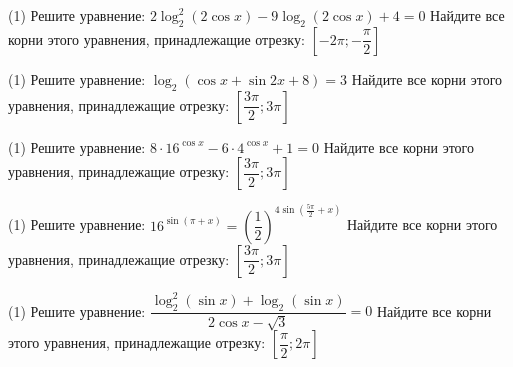 \begin{homework}[number=1]
	\begin{listofex}
		\item %
		\begin{tasks}(1)
			\task Решите уравнение: \( 2\log_2^2 (2\cos x) - 9 \log_2 (2\cos x) +4 = 0 \)
			\task Найдите все корни этого уравнения, принадлежащие отрезку: \( \left[ -2\pi; -\dfrac{\pi}{2} \right] \)
		\end{tasks}
		\item %
		\begin{tasks}(1)
			\task Решите уравнение: \( \log_2 (\cos x + \sin{2x} + 8) = 3 \)
			\task Найдите все корни этого уравнения, принадлежащие отрезку: \( \left[ \dfrac{3\pi}{2}; 3\pi \right] \)
		\end{tasks}
		\item %
		\begin{tasks}(1) 
			\task Решите уравнение: \( 8 \cdot 16^{\cos x} - 6 \cdot 4^{\cos x} + 1 = 0 \)
			\task Найдите все корни этого уравнения, принадлежащие отрезку: \( \left[ \dfrac{3\pi}{2}; 3 \pi \right] \)
		\end{tasks}
		\item %
		\begin{tasks}(1)
			\task Решите уравнение: \( 16^{\sin (\pi+x)}= \left( \dfrac{1}{2} \right)^{4\sin{(\frac{5\pi}{2}+x)}} \)
			\task Найдите все корни этого уравнения, принадлежащие отрезку: \( \left[ \dfrac{3\pi}{2}; 3\pi \right] \)
		\end{tasks}
		\item %
		\begin{tasks}(1)
			\task Решите уравнение: \( \dfrac{\log^2_2 (\sin x) + \log_2 (\sin{x})}{2\cos x - \sqrt{3}} = 0 \)
			\task Найдите все корни этого уравнения, принадлежащие отрезку: \( \left[ \dfrac{\pi}{2}; 2\pi \right] \)
		\end{tasks}
	\end{listofex}
\end{homework}

